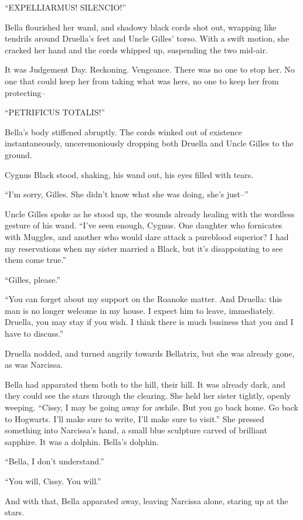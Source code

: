 “EXPELLIARMUS! SILENCIO!”

Bella flourished her wand, and shadowy black cords shot out, wrapping like tendrils around Druella’s feet and Uncle Gilles’ torso. With a swift motion, she cracked her hand and the cords whipped up, suspending the two mid-air.

It was Judgement Day. Reckoning. Vengeance. There was no one to stop her. No one that could keep her from taking what was hers, no one to keep her from protecting–

“PETRIFICUS TOTALIS!”

Bella’s body stiffened abruptly. The cords winked out of existence instantaneously, unceremoniously dropping both Druella and Uncle Gilles to the ground.

Cygnus Black stood, shaking, his wand out, his eyes filled with tears.

“I’m sorry, Gilles. She didn’t know what she was doing, she’s just–”

Uncle Gilles spoke as he stood up, the wounds already healing with the wordless gesture of his wand. “I’ve seen enough, Cygnus. One daughter who fornicates with Muggles, and another who would dare attack a pureblood superior? I had my reservations when my sister married a Black, but it’s disappointing to see them come true.”

“Gilles, please.”

“You can forget about my support on the Roanoke matter. And Druella: this man is no longer welcome in my house. I expect him to leave, immediately. Druella, you may stay if you wish. I think there is much business that you and I have to discuss.”

Druella nodded, and turned angrily towards Bellatrix, but she was already gone, as was Narcissa.

Bella had apparated them both to the hill, their hill. It was already dark, and they could see the stars through the clearing. She held her sister tightly, openly weeping. “Cissy, I may be going away for awhile. But you go back home. Go back to Hogwarts. I’ll make sure to write, I’ll make sure to visit.” She pressed something into Narcissa’s hand, a small blue sculpture carved of brilliant sapphire. It was a dolphin. Bella’s dolphin.

“Bella, I don’t understand.”

“You will, Cissy. You will.”

And with that, Bella apparated away, leaving Narcissa alone, staring up at the stars.
\simpleline

